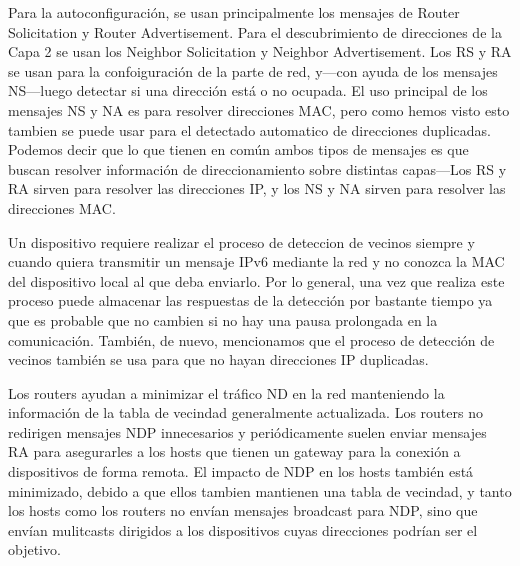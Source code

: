 \documentclass[a4paper,10pt]{corsage}
\begin{document}
	Para la autoconfiguración, se usan principalmente los mensajes de Router Solicitation y Router Advertisement.  Para el descubrimiento  de direcciones de la Capa 2 se usan los Neighbor Solicitation y Neighbor Advertisement.  Los RS y RA se usan para la confoiguración de la parte de red, y---con ayuda de los mensajes NS---luego detectar si una dirección está o no ocupada.  El uso principal de los mensajes NS y NA es para resolver direcciones MAC, pero como hemos visto esto tambien se puede usar para el detectado automatico de direcciones duplicadas.  Podemos decir que lo que tienen en común ambos tipos de mensajes es que buscan resolver información de direccionamiento sobre distintas capas---Los RS y RA sirven para resolver las direcciones IP, y los NS y NA sirven para resolver las direcciones MAC.

	Un dispositivo requiere realizar el proceso de deteccion de vecinos siempre y cuando quiera transmitir un mensaje IPv6 mediante la red y no conozca la MAC del dispositivo local al que deba enviarlo.  Por lo general, una vez que realiza este proceso puede almacenar las respuestas de la detección por bastante tiempo ya que es probable que no cambien si no hay una pausa prolongada en la comunicación.  También, de nuevo, mencionamos que el proceso de detección de vecinos también se usa para que no hayan direcciones IP duplicadas.

	Los routers ayudan a minimizar el tráfico ND en la red manteniendo la información de la tabla de vecindad generalmente actualizada.  Los routers no redirigen mensajes NDP innecesarios y periódicamente suelen enviar mensajes RA para asegurarles a los hosts que tienen un gateway para la conexión a dispositivos de forma remota.  El impacto de NDP en los hosts también está minimizado, debido a que ellos tambien mantienen una tabla de vecindad, y tanto los hosts como los routers no envían mensajes broadcast para NDP, sino que envían mulitcasts dirigidos a los dispositivos cuyas direcciones podrían ser el objetivo.
\end{document}

